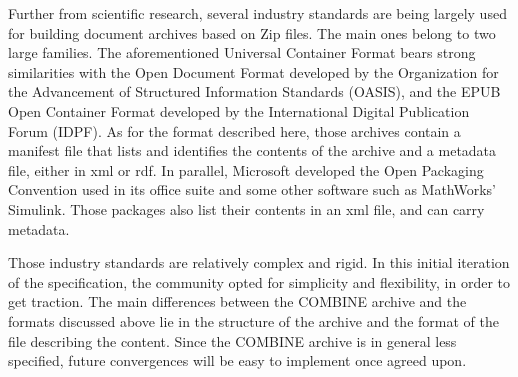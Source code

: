 Further from scientific research, several industry standards are being largely 
used for building document archives based on Zip files. The main ones belong to 
two large families. The aforementioned Universal Container Format bears strong 
similarities with the Open Document Format \cite{ODF} developed by the Organization 
for the Advancement of Structured Information Standards (OASIS), and the EPUB 
Open Container Format  \cite{OCF} developed by the International Digital Publication 
Forum (IDPF). As for the format described here, those archives contain a manifest 
file that lists and identifies the contents of the archive and a metadata file, 
either in xml or rdf. In parallel, Microsoft developed the Open Packaging Convention  \cite{OPC} 
used in its office suite and some other software such as MathWorks' Simulink. Those 
packages also list their contents in an xml file, and can carry metadata. 


Those industry standards are relatively complex and rigid. In this initial iteration 
of the specification, the community opted for simplicity and flexibility, in order 
to get traction. The main differences between the COMBINE archive and the formats 
discussed above lie in the structure of the archive and the format of the file 
describing the content. Since the COMBINE archive is in general less specified, 
future convergences will be easy to implement once agreed upon.
